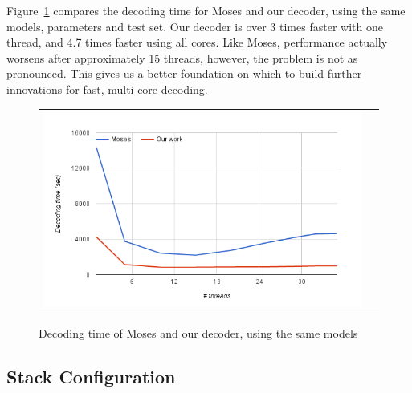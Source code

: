 \documentclass[11pt]{article}
\begin{document}
Figure~\ref{fig:mempool} compares the decoding time for Moses and our decoder, using the same models, parameters and test set. Our decoder is over 3 times faster with one thread, and 4.7 times faster using all cores. Like Moses, performance actually worsens after approximately 15 threads, however, the problem is not as pronounced. This gives us a better foundation on which to build further innovations for fast, multi-core decoding.
\begin{figure}[h]
\centering
\begin{tabular}{cc}
{\includegraphics[scale=0.4]{mempool.png}} 
\end{tabular}
\caption{Decoding time of Moses and our decoder, using the same models}
\label{fig:mempool}
\end{figure} 


\subsection{Stack Configuration}
\end{document}
